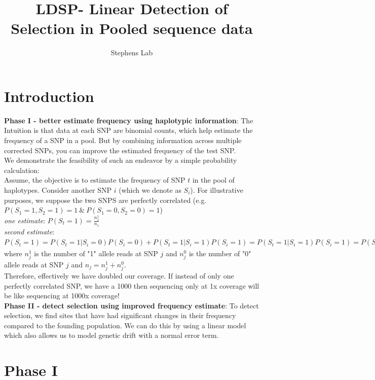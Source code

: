 \documentclass[10pt,a4paper,draft]{article}
\title{LDSP- Linear Detection of Selection in Pooled sequence data}
\date{}
\author{Stephens Lab}
\begin{document}
\maketitle
\section{Introduction}
\textbf{Phase I - better estimate frequency using haplotypic information}:
The Intuition is that data at each SNP are binomial counts, which help estimate the frequency of a SNP in a pool. But by combining information across multiple corrected SNPs, you can improve the estimated frequency of the test SNP. \\

We demonstrate the feasibility of such an endeavor by a simple probability calculation:\\

Assume, the objective is to estimate the frequency of SNP $t$ in the pool of haplotypes. Consider another SNP $i$ (which we denote as $S_i$). For illustrative purposes, we suppose the two SNPS are perfectly correlated (e.g. $P(S_1 = 1, S_2 = 1) = 1 \ \& \ P(S_1 = 0, S_2 = 0) = 1$) \\

\textit{one estimate}: $P(S_t = 1) = \frac{n_1^1}{n_1}$ \\
\textit{second estimate}:  $P(S_t = 1) = P(S_t = 1 | S_i = 0)P(S_i=0) + P(S_t = 1 | S_i = 1)P(S_i=1) = P(S_t = 1 | S_i = 1)P(S_i = 1) = P(S_i = 1) = \frac{n_2^1}{n_2}$ \\

where $n_j^1$ is the number of "1" allele reads at SNP $j$ and $n_j^0$ is the number of "0" allele reads at SNP $j$ and $n_j = n_j^1 + n_j^0$. \\

Therefore, effectively we have doubled our coverage. If instead of only one perfectly correlated SNP, we have a 1000 then sequencing only at 1x coverage will be like sequencing at 1000x coverage! \\

\textbf{Phase II - detect selection using improved frequency estimate}:
To detect selection, we find sites that have had significant changes in their frequency compared to the founding population. We can do this by using a linear model which also allows us to model genetic drift with a normal error term.

\section{Phase I}
\end{document}
